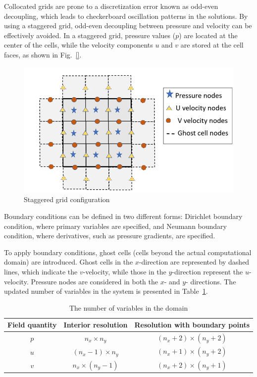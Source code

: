 \documentclass{article}
\numberwithin{equation}{section}
\numberwithin{figure}{section}
\begin{document}
Collocated grids are prone to a discretization error known as odd-even 
decoupling, which leads to checkerboard oscillation patterns in the solutions. By 
using a staggered grid, odd-even decoupling between pressure and velocity can be 
effectively avoided. In a staggered grid, pressure values (\( p \)) are located at the 
center of the cells, while the velocity components \( u \) and \( v \) are stored at the cell 
faces, as shown in Fig.~\ref{}.
\begin{figure}
    \includegraphics{staggered_grid.png}
    \caption{Staggered grid configuration}
\end{figure}

Boundary conditions can be defined in two different forms: 
Dirichlet boundary condition, where primary variables are specified, and 
Neumann boundary condition, where derivatives, such as pressure gradients, are specified. 

To apply boundary conditions, ghost cells (cells beyond the actual computational domain) 
are introduced. Ghost cells in the \( x \)-direction are represented by dashed lines, 
which indicate the \( v \)-velocity, while those in the \( y \)-direction represent 
the \( u \)-velocity. Pressure nodes are considered in both the \( x \)- and \( y \)-
directions. The updated number of variables in the system is presented in Table~\ref{tab:variables}.

\begin{table}
    \centering
    \caption{The number of variables in the domain}
    \label{tab:variables}
    \begin{tabular}{c c c}
        \toprule
        Field quantity & Interior resolution   & Resolution with boundary points \\
        \midrule
        $p$             & $n_x \times n_y$      & $(n_x +2)\times(n_y +2)$         \\
        $u$             & $(n_x -1) \times n_y$ & $(n_x+1)\times(n_y +2) $        \\
        $v$             & $n_x \times (n_y -1)$ & $(n_x +2)\times(n_y +1)$         \\
        \bottomrule        
    \end{tabular}
\end{table}
\end{document}
